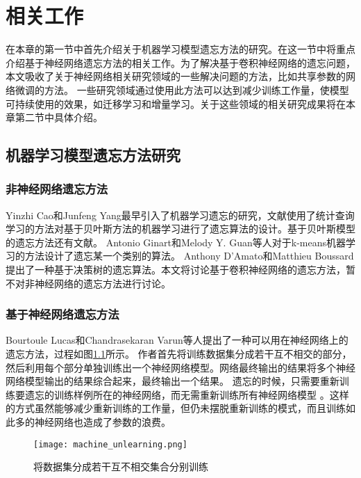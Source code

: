 
\chapter{相关工作}

在本章的第一节中首先介绍关于机器学习模型遗忘方法的研究。在这一节中将重点介绍基于神经网络遗忘方法的相关工作。为了解决基于卷积神经网络的遗忘问题，本文吸收了关于神经网络相关研究领域的一些解决问题的方法，比如共享参数的网络微调的方法。
一些研究领域通过使用此方法可以达到减少训练工作量，使模型可持续使用的效果，如迁移学习和增量学习。关于这些领域的相关研究成果将在本章第二节中具体介绍。

\section{机器学习模型遗忘方法研究}
\subsection{非神经网络遗忘方法}
Yinzhi Cao和Junfeng Yang\cite{yinzhicao2015}最早引入了机器学习遗忘的研究，文献使用了统计查询学习\cite{10.1145/293347.293351}的方法对基于贝叶斯方法的机器学习进行了遗忘算法的设计。基于贝叶斯模型的遗忘方法还有文献\cite{10.1145/3196494.3196517}。
Antonio Ginart和Melody Y. Guan等人\cite{antonio2019}对于k-means机器学习的方法设计了遗忘某一个类别的算法。
Anthony D’Amato和Matthieu Boussard\cite{10.1007/978-3-319-40159-1_19}提出了一种基于决策树的遗忘算法。本文将讨论基于卷积神经网络的遗忘方法，暂不对非神经网络的遗忘方法进行讨论。

\subsection{基于神经网络遗忘方法}
Bourtoule Lucas和Chandrasekaran Varun等人\cite{2019arXiv191203817B}提出了一种可以用在神经网络上的遗忘方法，过程如图\ref{fig:machine_unlearning}所示。
作者首先将训练数据集分成若干互不相交的部分，然后利用每个部分单独训练出一个神经网络模型。网络最终输出的结果将多个神经网络模型输出的结果综合起来，最终输出一个结果。
遗忘的时候，只需要重新训练要遗忘的训练样例所在的神经网络，而无需重新训练所有神经网络模型
。这样的方式虽然能够减少重新训练的工作量，但仍未摆脱重新训练的模式，而且训练如此多的神经网络也造成了参数的浪费。
\begin{figure}
    \centering
    \texttt{[image: machine\_unlearning.png]}
    \caption{将数据集分成若干互不相交集合分别训练}
    \label{fig:machine_unlearning}
\end{figure}

